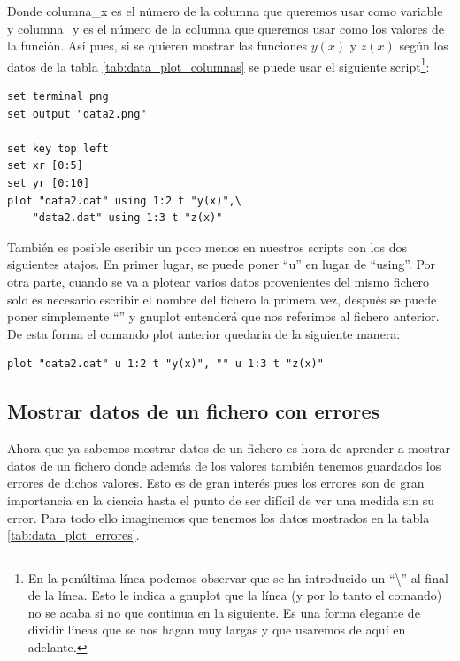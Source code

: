 \documentclass[11pt,a4paper,twoside,pdf]{article}
\numberwithin{equation}{section}
\begin{document}
Donde columna\_x es el número de la columna que queremos usar como variable y columna\_y es el número de la columna que queremos usar como los valores de la función. Así pues, si se quieren mostrar las funciones $y(x)$ y $z(x)$ según los datos de la tabla \ref{tab:data_plot_columnas} se puede usar el siguiente script\footnote{En la penúltima línea podemos observar que se ha introducido un ``\textbackslash'' al final de la línea. Esto le indica a gnuplot que la línea (y por lo tanto el comando) no se acaba si no que continua en la siguiente. Es una forma elegante de dividir líneas que se nos hagan muy largas y que usaremos de aquí en adelante.}:

\begin{lstlisting}[language=Gnuplot]
set terminal png
set output "data2.png"

set key top left
set xr [0:5]
set yr [0:10]
plot "data2.dat" using 1:2 t "y(x)",\
    "data2.dat" using 1:3 t "z(x)"
\end{lstlisting}

También es posible escribir un poco menos en nuestros scripts con los dos siguientes atajos. En primer lugar, se puede poner ``u'' en lugar de ``using''. Por otra parte, cuando se va a plotear varios datos provenientes del mismo fichero solo es necesario escribir el nombre del fichero la primera vez, después se puede poner simplemente ``'' y gnuplot entenderá que nos referimos al fichero anterior. De esta forma el comando plot anterior quedaría de la siguiente manera:

\begin{lstlisting}[language=Gnuplot]
plot "data2.dat" u 1:2 t "y(x)", "" u 1:3 t "z(x)"
\end{lstlisting}

\subsection{Mostrar datos de un fichero con errores}

Ahora que ya sabemos mostrar datos de un fichero es hora de aprender a mostrar datos de un fichero donde además de los valores también tenemos guardados los errores de dichos valores. Esto es de gran interés pues los errores son de gran importancia en la ciencia hasta el punto de ser difícil de ver una medida sin su error. Para todo ello imaginemos que tenemos los datos mostrados en la tabla \ref{tab:data_plot_errores}. \\
\end{document}
